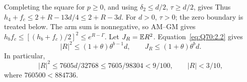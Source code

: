 Completing the square for \(p\ge\allowbreak 0\), and using
\(\delta_2\le\allowbreak  d/2\), \(\tau\ge\allowbreak  d/2\), gives
Thus \(h_4+f_c\le\allowbreak 2+R-13d/4\le\allowbreak 2+R-3d\).
For \(d>\allowbreak 0\), \(\tau>\allowbreak 0\); the zero boundary is treated below.
The arm sum is nonnegative, so AM--GM gives
\(h_bf_c\le\allowbreak [(h_b+f_c)/2]^2\le\allowbreak  e^{R-\Gamma}\).
Let \(J_R=\allowbreak \mathbb E R^2\). Equation~\eqref{eq:Q70:2.2} gives
\begin{equation}\tag{Q70.2.6}\label{eq:Q70:2.6}
|R|^2\le(1+\theta)\theta^{b-1}d,\qquad
J_R\le(1+\theta)\theta^bd.
\end{equation}
In particular,
\begin{equation}\tag{Q70.2.7}\label{eq:Q70:2.7}
|R|^2\le7605d/32768\le7605/98304<9/100,\qquad |R|<3/10,
\end{equation}
where \(760500<\allowbreak 884736\).

